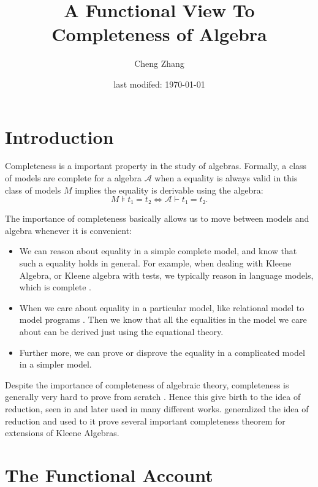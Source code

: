 \documentclass{article}
\title{A Functional View To Completeness of Algebra}
\author{Cheng Zhang}
\date{last modifed: \today}
\theoremstyle{plain}
\theoremstyle{definition}
\theoremstyle{remark}
\begin{document}
\maketitle


\section{Introduction}

Completeness is a important property in the study of algebras. 
Formally, a class of models are complete for a algebra \(𝒜\) when 
a equality is always valid in this class of models \(M\) implies 
the equality is derivable using the algebra:
\[M ⊧ t₁ = t₂ ⇔ 𝒜 ⊢ t₁ = t₂.\]

The importance of completeness basically allows us to move between 
models and algebra whenever it is convenient:
\begin{itemize}
    \item We can reason about equality in a simple complete model, 
        and know that such a equality holds in general.
        For example, when dealing with Kleene Algebra, or Kleene algebra 
        with tests, we typically reason in language models, which is complete
        \parencite{Kozen_1994, Kozen_1997}. 
    \item When we care about equality in a particular model, 
        like relational model to model programs 
        \parencite{Kozen_1997,Smolka_Foster_Hsu_Kappé_Kozen_Silva_2020}.
        Then we know that all the equalities in the model we care about can 
        be derived just using the equational theory.
    \item Further more, we can prove or disprove 
        the equality in a complicated model in a simpler model.
\end{itemize}

Despite the importance of completeness of algebraic theory,
completeness is generally very hard to prove from scratch 
\parencite{Kozen_1994,Smolka_Foster_Hsu_Kappé_Kozen_Silva_2020}.
Hence this give birth to the idea of reduction, 
seen in \cite{Kozen_1997} and later used in many different works.
\cite{Pous_Rot_Wagemaker_2022} generalized the idea of reduction
and used to it prove several important completeness theorem 
for extensions of Kleene Algebras.


\section{The Functional Account}
\end{document}
